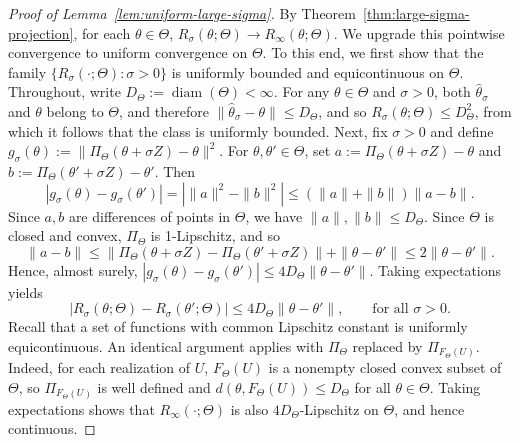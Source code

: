 \documentclass[11pt]{article}
\theoremstyle{plain}
\theoremstyle{definition}
\begin{document}
\begin{proof}[Proof of Lemma~\ref{lem:uniform-large-sigma}]
By Theorem~\ref{thm:large-sigma-projection}, for each $\theta\in\Theta$, $R_\sigma(\theta; \Theta)\to R_\infty(\theta; \Theta)$. We upgrade this pointwise convergence to uniform convergence on $\Theta$. To this end, we first show that the family $\{R_\sigma(\cdot; \Theta):\sigma>0\}$ is uniformly bounded and equicontinuous on $\Theta$.
Throughout, write $D_\Theta:=\operatorname{diam}(\Theta)<\infty$. For any $\theta\in\Theta$ and $\sigma>0$, both $\hat\theta_\sigma$ and
$\theta$ belong to $\Theta$, and therefore $\|\hat\theta_\sigma-\theta\|\le D_\Theta$, and so $R_\sigma(\theta; \Theta)\le D_\Theta^2$, from which it follows that the class is uniformly bounded. Next, fix $\sigma>0$ and define $g_\sigma(\theta):=\|\Pi_\Theta(\theta+\sigma Z)-\theta\|^2$. For $\theta,\theta'\in\Theta$, set $a:=\Pi_\Theta(\theta+\sigma Z)-\theta$ and $
b:=\Pi_\Theta(\theta'+\sigma Z)-\theta'$. Then
\[
|g_\sigma(\theta)-g_\sigma(\theta')|
=|\|a\|^2-\|b\|^2|
\le(\|a\|+\|b\|)\|a-b\|.
\]
Since $a,b$ are differences of points in $\Theta$, we have
$\|a\|,\|b\|\le D_\Theta$. Since $\Theta$ is closed and convex, $\Pi_\Theta$ is 1-Lipschitz, and so
\[
\|a-b\|
\le
\|\Pi_\Theta(\theta+\sigma Z)-\Pi_\Theta(\theta'+\sigma Z)\|
+\|\theta-\theta'\|
\le 2\|\theta-\theta'\|.
\]
Hence, almost surely, $|g_\sigma(\theta)-g_\sigma(\theta')|
\le 4D_\Theta\|\theta-\theta'\|$. Taking expectations yields
\[
|R_\sigma(\theta; \Theta)-R_\sigma(\theta';\Theta)|
\le 4D_\Theta\|\theta-\theta'\|,
\qquad
\text{for all }\sigma>0.
\]
Recall that a set of functions with common Lipschitz constant is uniformly equicontinuous. An identical argument applies with $\Pi_\Theta$ replaced by $\Pi_{F_\Theta(U)}$. Indeed, for each realization of $U$, $F_\Theta(U)$ is a nonempty closed convex subset of $\Theta$,
so $\Pi_{F_\Theta(U)}$ is well defined and $d(\theta,F_\Theta(U))\le D_\Theta$ for all $\theta\in\Theta$. Taking expectations shows that $R_\infty(\cdot;\Theta)$ is also $4D_\Theta$-Lipschitz on $\Theta$, and hence continuous.



\end{proof}
\end{document}
